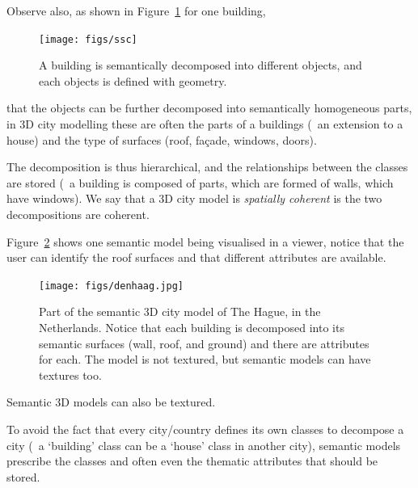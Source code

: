 %

Observe also, as shown in Figure~\ref{fig:ssc} for one building, 
\begin{figure}
  \centering
  \texttt{[image: figs/ssc]}
  \caption{A building is semantically decomposed into different objects, and each objects is defined with geometry.}%
\label{fig:ssc}
\end{figure}
that the objects can be further decomposed into semantically homogeneous parts, in 3D city modelling these are often the parts of a buildings (\eg\ an extension to a house) and the type of surfaces (roof, façade, windows, doors).

The decomposition is thus hierarchical, and the relationships between the classes are stored (\eg\ a building is composed of parts, which are formed of walls, which have windows). 
We say that a 3D city model is \emph{spatially coherent} is the two decompositions are coherent.

%

Figure~\ref{fig:denhaag} shows one semantic model being visualised in a viewer, notice that the user can identify the roof surfaces and that different attributes are available.
\begin{figure}
  \centering
  \texttt{[image: figs/denhaag.jpg]}
  \caption{Part of the semantic 3D city model of The Hague, in the Netherlands. Notice that each building is decomposed into its semantic surfaces (wall, roof, and ground) and there are attributes for each. The model is not textured, but semantic models can have textures too.}%
\label{fig:denhaag}
\end{figure}
Semantic 3D models can also be textured.

%

To avoid the fact that every city/country defines its own classes to decompose a city (\eg\ a `building' class can be a `house' class in another city), semantic models prescribe the classes and often even the thematic attributes that should be stored.




